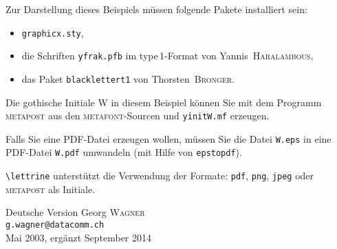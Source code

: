 \documentclass[12pt,a4paper]{article}
\newcommand{\MF}{{\small\sffamily\scshape metafont}}
\newcommand{\MP}{{\small\sffamily\scshape metapost}}
\begin{document}
Zur Darstellung dieses Beispiels m\"ussen folgende Pakete installiert sein:
\begin{itemize}
\item \verb+graphicx.sty+,
\item die Schriften \verb+yfrak.pfb+ im type\,1-Format
   von Yannis~\textsc{Haralambous},
\item das Paket \verb+blacklettert1+ von Thorsten~\textsc{Bronger}.
\end{itemize}

Die gothische Initiale \glqq W\grqq{} in diesem Beispiel k\"onnen Sie mit dem
Programm \MP{} aus den \MF{}-Sourcen und \verb+yinitW.mf+ erzeugen.

Falls Sie eine PDF-Datei erzeugen wollen, m\"ussen Sie die Datei \verb+W.eps+
in eine PDF-Datei \verb+W.pdf+ umwandeln (mit Hilfe von \verb+epstopdf+).

\verb+\lettrine+ unterst\"utzt die Verwendung der Formate:
\texttt{pdf}, \texttt{png}, \texttt{jpeg} oder \MP{} als Initiale.

\vfill
\begin{flushright}
  Deutsche Version Georg \textsc{Wagner}\\
  \texttt{g.wagner@datacomm.ch}\\
  Mai 2003, erg\"anzt September 2014
\end{flushright}
\end{document}
